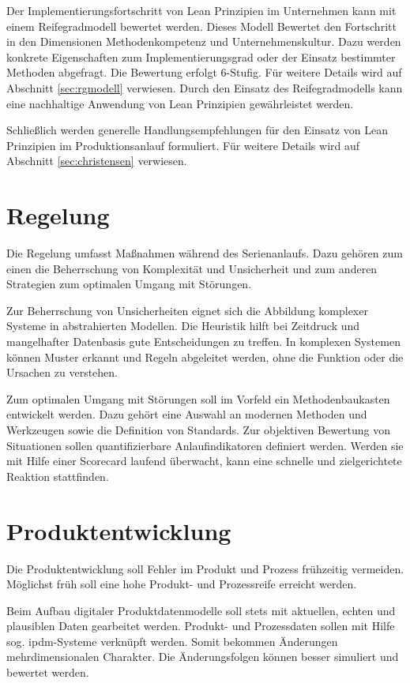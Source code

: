 Der Implementierungsfortschritt von Lean Prinzipien im Unternehmen kann mit einem Reifegradmodell bewertet werden. Dieses Modell Bewertet den Fortschritt in den Dimensionen Methodenkompetenz und Unternehmenskultur. Dazu werden konkrete Eigenschaften zum Implementierungsgrad oder der Einsatz bestimmter Methoden abgefragt. Die Bewertung erfolgt 6-Stufig. Für weitere Details wird auf Abschnitt \ref{sec:rgmodell} verwiesen. Durch den Einsatz des Reifegradmodells kann eine nachhaltige Anwendung von Lean Prinzipien gewährleistet werden. 

Schließlich werden generelle Handlungsempfehlungen für den Einsatz von Lean Prinzipien im Produktionsanlauf formuliert. Für weitere Details wird auf Abschnitt \ref{sec:christensen} verwiesen.

\section{Regelung}

Die Regelung umfasst Maßnahmen während des Serienanlaufs. Dazu gehören zum einen die Beherrschung von Komplexität und Unsicherheit und zum anderen Strategien zum optimalen Umgang mit Störungen. 

Zur Beherrschung von Unsicherheiten eignet sich die Abbildung komplexer Systeme in abstrahierten Modellen. Die Heuristik hilft bei Zeitdruck und mangelhafter Datenbasis gute Entscheidungen zu treffen. In komplexen Systemen können Muster erkannt und Regeln abgeleitet werden, ohne die Funktion oder die Ursachen zu verstehen. 

Zum optimalen Umgang mit Störungen soll im Vorfeld ein Methodenbaukasten entwickelt werden. Dazu gehört eine Auswahl an modernen Methoden und Werkzeugen sowie die Definition von Standards. Zur objektiven Bewertung von Situationen sollen quantifizierbare Anlaufindikatoren definiert werden. Werden sie mit Hilfe einer Scorecard laufend überwacht, kann eine schnelle und zielgerichtete Reaktion stattfinden. 

\section{Produktentwicklung}

Die Produktentwicklung soll Fehler im Produkt und Prozess frühzeitig vermeiden. Möglichst früh soll eine hohe Produkt- und Prozessreife erreicht werden. 

Beim Aufbau digitaler Produktdatenmodelle soll stets mit aktuellen, echten und plausiblen Daten gearbeitet werden. Produkt- und Prozessdaten sollen mit Hilfe sog. \gls{ipdm}-Systeme verknüpft werden. Somit bekommen Änderungen mehrdimensionalen Charakter. Die Änderungsfolgen können besser simuliert und bewertet werden. 

